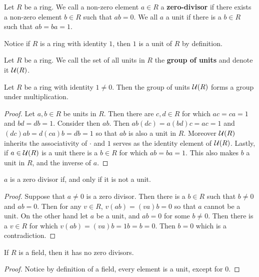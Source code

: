 \begin{definition}
  Let $R$ be a ring. We call a non-zero element $a \in R$ a
  \textbf{zero-divisor} if there exists a non-zero element $b \in R$
  such that $ab=0$. We all $a$ a unit if there is a $b \in R$ such
  that $ab=ba=1$.
\end{definition}

\begin{example}\label{example_5.2}
  Notice if $R$ is a ring with identity $1$, then $1$ is a unit of $R$ by
  definition.
\end{example}

\begin{definition}
  Let $R$ be a ring. We call the set of all units in  $R$ the \textbf{group
  of units} and denote it $\mathcal{U}(R)$.
\end{definition}

\begin{proposition}\label{proposition_5.1.2}
  Let $R$ be a ring with identity $1 \neq 0$. Then the group of units
  $\mathcal{U}(R)$ forms a group under multiplication.
\end{proposition}
\begin{proof}
  Let $a,b \in R$ be units in $R$. Then there are $c,d \in R$ for which
  $ac=ca=1$ and  $bd=db=1$. Consider then $ab$. Then  $ab(dc)=a(bd)c=ac=1$ and
  $(dc)ab=d(ca)b=db=1$ so that $ab$ is also a unit in $R$. Moreover $\mathcal{U}{(R)}$
  inherits the associativity of  $\cdot$ and $1$ serves as the identity
  element of $\mathcal{U}{(R)}$. Lastly, if $a \in \mathcal{U}{(R)}$ is a unit there is a $b
  \in R$ for which $ab=ba=1$. This also makes $b$ a unit in $R$, and the
  inverse of $a$.
\end{proof}
\begin{corollary}
  $a$ is a zero divisor if, and only if it is not a unit.
\end{corollary}

\begin{proof}
  Suppose that $a \neq 0$ is a zero divisor. Then there is a  $b \in R$ such
  that $b \neq 0$ and $ab=0$. Then for any $v \in R$,  $v(ab)=(va)b=0$ so that
  $a$ cannot be a unit. On the other hand let  $a$ be a unit, and  $ab=0$ for
  some  $b \neq 0$. Then there is a  $v \in R$ for which
  $v(ab)=(va)b=1b=b=0$. Then $b=0$ which is a contradiction.
\end{proof}
\begin{corollary}
  If $R$ is a field, then it has no zero divisors.
\end{corollary}
\begin{proof}
  Notice by definition of a field, every element is a unit, except for $0$.
\end{proof}

